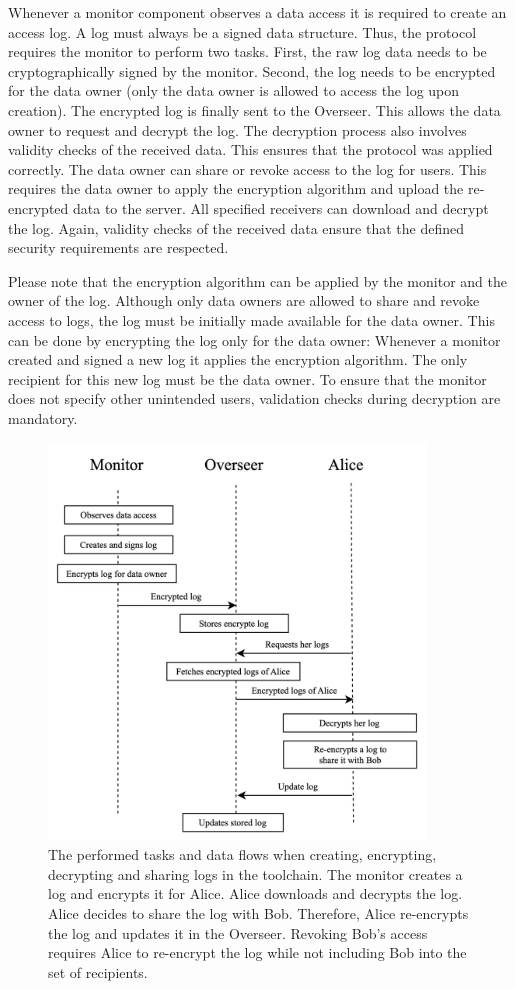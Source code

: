 \documentclass[../main.tex]{subfiles}
\begin{document}
Whenever a monitor component observes a data access it is required to create an access log.
A log must always be a signed data structure.
Thus, the protocol requires the monitor to perform two tasks.
First, the raw log data needs to be cryptographically signed by the monitor.
Second, the log needs to be encrypted for the data owner (only the data owner is allowed to access the log upon creation).
The encrypted log is finally sent to the Overseer.
This allows the data owner to request and decrypt the log.
The decryption process also involves validity checks of the received data.
This ensures that the protocol was applied correctly.
The data owner can share or revoke access to the log for users.
This requires the data owner to apply the encryption algorithm and upload the re-encrypted data to the server.
All specified receivers can download and decrypt the log.
Again, validity checks of the received data ensure that the defined security requirements are respected.

Please note that the encryption algorithm can be applied by the monitor and the owner of the log.
Although only data owners are allowed to share and revoke access to logs, the log must be initially made available for the data owner.
This can be done by encrypting the log only for the data owner:
Whenever a monitor created and signed a new log it applies the encryption algorithm.
The only recipient for this new log must be the data owner.
To ensure that the monitor does not specify other unintended users, validation checks during decryption are mandatory.

\begin{figure}[h!]
    \includegraphics[width=10cm]{../img/05/overview.jpg}
    \centering
    \caption{
        The performed tasks and data flows when creating, encrypting, decrypting and sharing logs in the toolchain.
        The monitor creates a log and encrypts it for Alice.
        Alice downloads and decrypts the log.
        Alice decides to share the log with Bob.
        Therefore, Alice re-encrypts the log and updates it in the Overseer.
        Revoking Bob's access requires Alice to re-encrypt the log while not including Bob into the set of recipients.
    }
    \label{fig:protocol-overview}
\end{figure}
\end{document}
